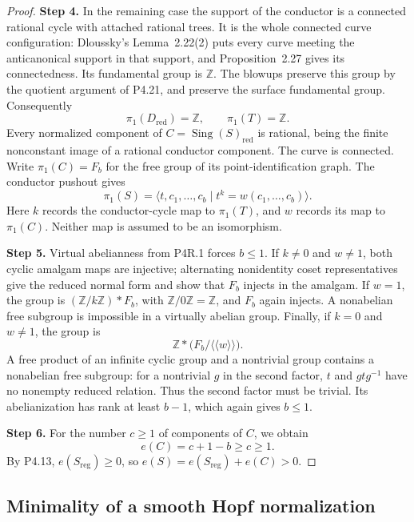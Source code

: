 \begin{proof}
\noindent\textbf{Step 4.} In the remaining case the support of the conductor is
a connected rational cycle with attached rational trees.
It is the whole connected curve configuration: Dloussky's
Lemma~2.22(2) puts every curve meeting the anticanonical
support in that support, and Proposition~2.27 gives its
connectedness. Its fundamental group is $\mathbb Z$.
The blowups preserve this group by the quotient argument
of P4.21, and preserve the surface fundamental group.
Consequently
\[
 \pi_1(D_{\mathrm{red}})=\mathbb Z,\qquad
 \pi_1(T)=\mathbb Z.
\]
Every normalized component of
$C=\operatorname{Sing}(S)_{\mathrm{red}}$ is rational,
being the finite nonconstant image of a rational conductor
component. The curve is connected. Write $\pi_1(C)=F_b$
for the free group of its point-identification graph.
The conductor pushout gives
\[
 \pi_1(S)=
 \langle t,c_1,\ldots,c_b\mid t^k=w(c_1,\ldots,c_b)\rangle.
\]
Here $k$ records the conductor-cycle map to $\pi_1(T)$,
and $w$ records its map to $\pi_1(C)$. Neither map is
assumed to be an isomorphism.

\noindent\textbf{Step 5.} Virtual abelianness from P4R.1 forces $b\le1$.
If $k\ne0$ and $w\ne1$, both cyclic amalgam maps are
injective; alternating nonidentity coset representatives
give the reduced normal form and show that $F_b$ injects
in the amalgam. If $w=1$, the group is
$(\mathbb Z/k\mathbb Z)*F_b$, with
$\mathbb Z/0\mathbb Z=\mathbb Z$, and $F_b$ again
injects. A nonabelian free subgroup is impossible in a
virtually abelian group. Finally, if $k=0$ and $w\ne1$,
the group is
\[
 \mathbb Z*\bigl(F_b/\langle\!\langle w\rangle\!\rangle\bigr).
\]
A free product of an infinite cyclic group and a nontrivial
group contains a nonabelian free subgroup: for a nontrivial
$g$ in the second factor, $t$ and $gtg^{-1}$ have no
nonempty reduced relation. Thus the second factor must
be trivial. Its abelianization has rank at least $b-1$,
which again gives $b\le1$.

\noindent\textbf{Step 6.} For the number $c\ge1$ of components of $C$, we obtain
\[
 e(C)=c+1-b\ge c\ge1.
\]
By P4.13, $e(S_{\mathrm{reg}})\ge0$, so
$e(S)=e(S_{\mathrm{reg}})+e(C)>0$.
\end{proof}

\subsection{Minimality of a smooth Hopf normalization}


